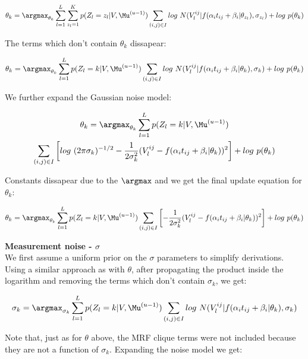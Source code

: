 \begin{equation}
\label{eq:SupTheta5}
 \theta_k = \argmax_{\theta_k} \sum_{l=1}^L \sum_{z_l = 1}^K p(Z_l = z_l | V, \Mu^{(u-1)}) \sum_{(i,j) \in I} log\ N(V_l^{ij} | f(\alpha_i t_{ij} + \beta_i | \theta_{z_l}), \sigma_{z_l}) + log\ p(\theta_k)
\end{equation}

The terms which don't contain $\theta_k$ dissapear:

\begin{equation}
 \theta_k = \argmax_{\theta_k} \sum_{l=1}^L p(Z_l = k | V, \Mu^{(u-1)}) \sum_{(i,j) \in I} log\ N(V_l^{ij} | f(\alpha_i t_{ij} + \beta_i | \theta_k), \sigma_k) + log\ p(\theta_k)
\end{equation}

We further expand the Gaussian noise model:

\begin{multline}
 \theta_k = \argmax_{\theta_k} \sum_{l=1}^L p(Z_l = k | V, \Mu^{(u-1)}) \\ \sum_{(i,j) \in I} \left[ log\ (2 \pi \sigma_k)^{-1/2} - \frac{1}{2\sigma_k^2}(V_l^{ij} - f(\alpha_i t_{ij} + \beta_i | \theta_k))^2 \right] + log\ p(\theta_k)
\end{multline}

Constants dissapear due to the $\argmax$ and we get the final update equation for $\theta_k$:

\begin{equation}
 \theta_k = \argmax_{\theta_k} \sum_{l=1}^L p(Z_l = k | V, \Mu^{(u-1)}) \sum_{(i,j) \in I} \left[ - \frac{1}{2\sigma_k^2}(V_l^{ij} - f(\alpha_i t_{ij} + \beta_i | \theta_k))^2 \right] + log\ p(\theta_k)
\end{equation}

\textbf{Measurement noise - $\sigma$}\\

We first assume a uniform prior on the $\sigma$ parameters to simplify derivations. Using a similar approach as with $\theta$, after propagating the product inside the logarithm and removing the terms which don't contain $\sigma_k$, we get:

\begin{equation}
 \sigma_k = \argmax_{\sigma_k} \sum_{l=1}^L p(Z_l = k | V, \Mu^{(u-1)}) \sum_{(i,j) \in I} log\ N(V_l^{ij} | f(\alpha_i t_{ij} + \beta_i | \theta_k), \sigma_k)
\end{equation}

Note that, just as for $\theta$ above, the MRF clique terms were not included because they are not a function of $\sigma_k$. Expanding the noise model we get:

